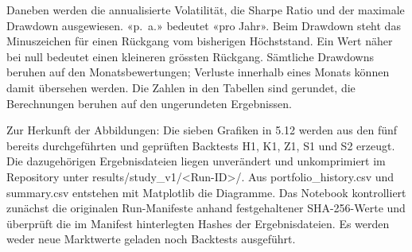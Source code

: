 \documentclass[
  ngerman,
  a4paper,
  DIV=11,
  oneside]{scrreprt}
\begin{document}
Daneben werden die annualisierte Volatilität, die Sharpe Ratio und der
maximale Drawdown ausgewiesen. «p.~a.» bedeutet «pro Jahr». Beim
Drawdown steht das Minuszeichen für einen Rückgang vom bisherigen
Höchststand. Ein Wert näher bei null bedeutet einen kleineren grössten
Rückgang. Sämtliche Drawdowns beruhen auf den Monatsbewertungen;
Verluste innerhalb eines Monats können damit übersehen werden. Die
Zahlen in den Tabellen sind gerundet, die Berechnungen beruhen auf den
ungerundeten Ergebnissen.

Zur Herkunft der Abbildungen: Die sieben Grafiken in 5.12 werden aus den
fünf bereits durchgeführten und geprüften Backtests H1, K1, Z1, S1 und
S2 erzeugt. Die dazugehörigen Ergebnisdateien liegen unverändert und
unkomprimiert im Repository unter
results/study\_v1/\textless Run-ID\textgreater/. Aus
portfolio\_history.csv und summary.csv entstehen mit Matplotlib die
Diagramme. Das Notebook kontrolliert zunächst die originalen
Run-Manifeste anhand festgehaltener SHA-256-Werte und überprüft die im
Manifest hinterlegten Hashes der Ergebnisdateien. Es werden weder neue
Marktwerte geladen noch Backtests ausgeführt.
\end{document}
